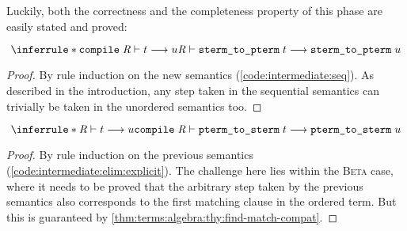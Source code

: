 
\noindent
Luckily, both the correctness and the completeness property of this phase are easily stated and proved:

\begin{theorem}[Correctness]\label{thm:intermediate:seq:correctness}
  \[
    \inferrule*{
      \rewrite{\holconst{compile}\;\R}{t}{u}
    }{\rewrite\R{\holconst{sterm\_to\_pterm}\;t}{\holconst{sterm\_to\_pterm}\;u}}
  \]
\end{theorem}

\begin{proof}
  By rule induction on the new semantics (\cref{code:intermediate:seq}).
  As described in the introduction, any step taken in the sequential semantics can trivially be taken in the unordered semantics too.
\end{proof}

\begin{theorem}[Completeness]\label{thm:intermediate:seq:completeness}
  \[
    \inferrule*{
      \rewrite\R{t}{u}
    }{\rewrite{\holconst{compile}\;\R}{\holconst{pterm\_to\_sterm}\;t}{\holconst{pterm\_to\_sterm}\;u}}
  \]
\end{theorem}

\begin{proof}
  By rule induction on the previous semantics (\cref{code:intermediate:elim:explicit}).
  The challenge here lies within the \textsc{Beta} case, where it needs to be proved that the arbitrary step taken by the previous semantics also corresponds to the first matching clause in the ordered term.
  But this is guaranteed by \cref{thm:terms:algebra:thy:find-match-compat}.
\end{proof}
